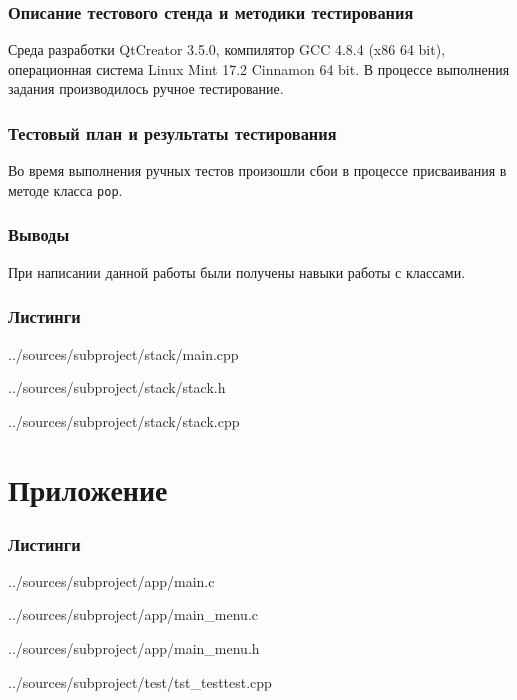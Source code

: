 \documentclass[12pt,a4paper]{report}
\begin{document}
\subsection{Описание тестового стенда и методики тестирования}
Среда разработки QtCreator 3.5.0, компилятор GCC 4.8.4 (x86 64 bit), операционная система Linux Mint 17.2 Cinnamon 64 bit.
В процессе выполнения задания производилось ручное тестирование.
\subsection{Тестовый план и результаты тестирования}
Во время выполнения ручных тестов произошли сбои в процессе присваивания в методе класса \verb+pop+.
\subsection{Выводы}
При написании данной работы были получены навыки работы с классами.
\subsection*{Листинги}


{../sources/subproject/stack/main.cpp}


{../sources/subproject/stack/stack.h}

{../sources/subproject/stack/stack.cpp}
\chapter{Приложение}
\subsection*{Листинги}


{../sources/subproject/app/main.c}


{../sources/subproject/app/main_menu.c}


{../sources/subproject/app/main_menu.h}


{../sources/subproject/test/tst_testtest.cpp}
\end{document}
